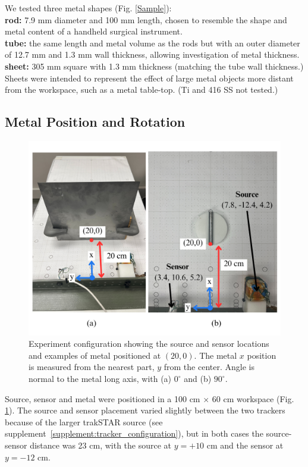 \documentclass[journal,twoside,web]{ieeecolor}
\begin{document}
We tested three metal shapes (Fig. \ref{Sample}):\\
\textbf{rod:}
7.9 mm diameter and 100 mm length, chosen to resemble the shape and metal content of a handheld surgical instrument.\\
\textbf{tube:}
the same length and metal volume as the rods but with an outer diameter of 12.7 mm and 1.3 mm wall thickness, allowing investigation of metal thickness.\\
\textbf{sheet:}
305 mm square with 1.3 mm thickness (matching the tube wall thickness.) Sheets were intended to represent the effect of large metal objects more distant from the workspace, such as a metal table-top. (Ti and 416 SS not tested.)


\subsection{Metal Position and Rotation}

\begin{figure}[H]
\centerline{\includegraphics[width=\columnwidth]{chaic5.png}}
\caption{Experiment configuration showing the source and sensor locations and examples of metal positioned at $(20, 0)$. The metal $x$ position is measured from the nearest part, $y$ from the center. Angle is normal to the metal long axis, with (a) $0^{\circ}$ and (b) $90^{\circ}$.}
\label{location_example}
\end{figure}

Source, sensor and metal were positioned in a 100 cm $\times$ 60 cm workspace (Fig. \ref{location_example}). The source and sensor placement varied slightly between the two trackers because of the larger trakSTAR source (see supplement~\ref{supplement:tracker_configuration}), but in both cases the source-sensor distance was 23 cm, with the source at $y=+10$ cm and the sensor at $y= -12$ cm.
\end{document}
